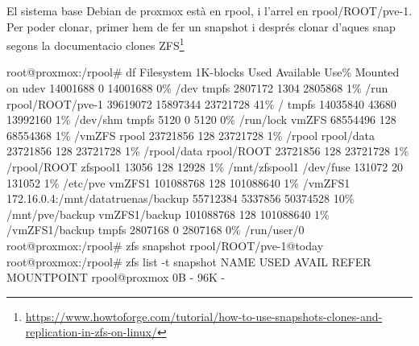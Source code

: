 \documentclass[
  10pt,
]{krantz}
\newenvironment{Shaded}{\begin{snugshade}}{\end{snugshade}}
\newcommand{\AttributeTok}[1]{\textcolor[rgb]{0.77,0.63,0.00}{#1}}
\newcommand{\ExtensionTok}[1]{#1}
\newcommand{\NormalTok}[1]{#1}
\DeclareRobustCommand{\href}[2]{#2\footnote{\url{#1}}}
\begin{document}
El sistema base Debian de proxmox està en rpool, i l'arrel en rpool/ROOT/pve-1. Per poder clonar, primer hem de fer un snapshot i després clonar d'aques snap segons la documentacio \href{https://www.howtoforge.com/tutorial/how-to-use-snapshots-clones-and-replication-in-zfs-on-linux/}{clones ZFS}

\begin{Shaded}
\begin{Highlighting}[]

\ExtensionTok{root@proxmox:/rpool\#}\NormalTok{ df}
\ExtensionTok{Filesystem}\NormalTok{                         1K{-}blocks     Used Available Use\% Mounted on}
\ExtensionTok{udev}\NormalTok{                                14001688        0  14001688   0\% /dev}
\ExtensionTok{tmpfs}\NormalTok{                                2807172     1304   2805868   1\% /run}
\ExtensionTok{rpool/ROOT/pve{-}1}\NormalTok{                    39619072 15897344  23721728  41\% /}
\ExtensionTok{tmpfs}\NormalTok{                               14035840    43680  13992160   1\% /dev/shm}
\ExtensionTok{tmpfs}\NormalTok{                                   5120        0      5120   0\% /run/lock}
\ExtensionTok{vmZFS}\NormalTok{                               68554496      128  68554368   1\% /vmZFS}
\ExtensionTok{rpool}\NormalTok{                               23721856      128  23721728   1\% /rpool}
\ExtensionTok{rpool/data}\NormalTok{                          23721856      128  23721728   1\% /rpool/data}
\ExtensionTok{rpool/ROOT}\NormalTok{                          23721856      128  23721728   1\% /rpool/ROOT}
\ExtensionTok{zfspool1}\NormalTok{                               13056      128     12928   1\% /mnt/zfspool1}
\ExtensionTok{/dev/fuse}\NormalTok{                             131072       20    131052   1\% /etc/pve}
\ExtensionTok{vmZFS1}\NormalTok{                             101088768      128 101088640   1\% /vmZFS1}
\ExtensionTok{172.16.0.4:/mnt/datatruenas/backup}\NormalTok{  55712384  5337856  50374528  10\% /mnt/pve/backup}
\ExtensionTok{vmZFS1/backup}\NormalTok{                      101088768      128 101088640   1\% /vmZFS1/backup}
\ExtensionTok{tmpfs}\NormalTok{                                2807168        0   2807168   0\% /run/user/0}
\ExtensionTok{root@proxmox:/rpool\#}\NormalTok{ zfs snapshot rpool/ROOT/pve{-}1@today}
\ExtensionTok{root@proxmox:/rpool\#}\NormalTok{ zfs list }\AttributeTok{{-}t}\NormalTok{ snapshot}
\ExtensionTok{NAME}\NormalTok{                             USED  AVAIL     REFER  MOUNTPOINT}
\ExtensionTok{rpool@proxmox}\NormalTok{                      0B      }\AttributeTok{{-}}\NormalTok{       96K  }\AttributeTok{{-}}

\end{Highlighting}
\end{Shaded}
\end{document}
